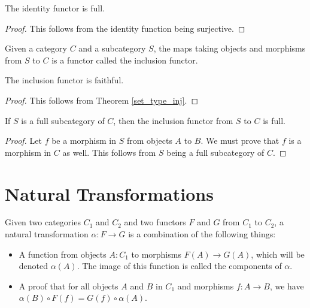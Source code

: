 \documentclass[../math.tex]{subfiles}
\begin{document}
\begin{theorem}
    The identity functor is full.
\end{theorem}
\begin{proof}
    This follows from the identity function being surjective.
\end{proof}

\begin{definition}
    Given a category $C$ and a subcategory $S$, the maps taking objects and
    morphisms from $S$ to $C$ is a functor called the inclusion functor.
\end{definition}

\begin{theorem}
    The inclusion functor is faithful.
\end{theorem}
\begin{proof}
    This follows from Theorem \ref{set_type_inj}.
\end{proof}

\begin{theorem}
    If $S$ is a full subcategory of $C$, then the inclusion functor from $S$ to
    $C$ is full.
\end{theorem}
\begin{proof}
    Let $f$ be a morphism in $S$ from objects $A$ to $B$.  We must prove that
    $f$ is a morphism in $C$ as well.  This follows from $S$ being a full
    subcategory of $C$.
\end{proof}

\section{Natural Transformations}

\begin{definition}
    Given two categories $C_1$ and $C_2$ and two functors $F$ and $G$ from $C_1$
    to $C_2$, a natural transformation $\alpha : F \to G$ is a combination of
    the following things:
    \begin{itemize}
        \item A function from objects $A : C_1$ to morphisms $F(A) \to G(A)$,
            which will be denoted $\alpha(A)$.  The image of this function is
            called the components of $\alpha$.
        \item A proof that for all objects $A$ and $B$ in $C_1$ and morphisms $f
            : A \to B$, we have $\alpha(B) \circ F(f) = G(f) \circ \alpha(A)$.
    \end{itemize}
\end{definition}
\end{document}
